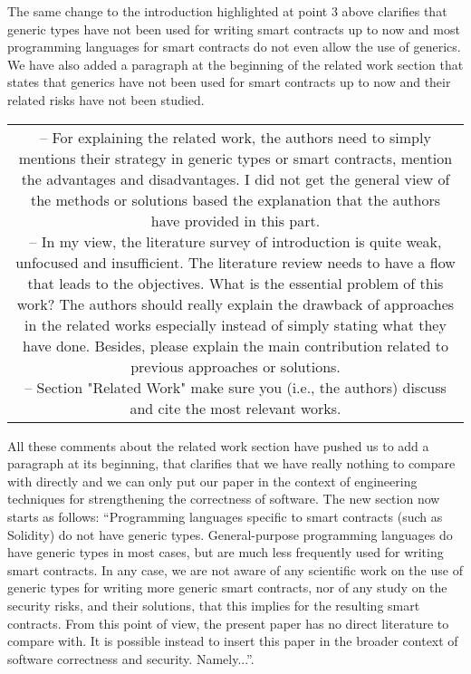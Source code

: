 \documentclass[journal,onecolumn, 11pt]{IEEEtran}
\newcommand{\BOX}[1]
{
  {\it
    \begin{center}
      \begin{tabular}{|c|}
        \hline
        \parbox{0.97\columnwidth}{
          \medskip
          #1
          \medskip} \\
        \hline
      \end{tabular}
    \end{center}
  }
}
\begin{document}
The same change to the introduction highlighted at point 3 above clarifies that generic types have not been used for writing smart contracts up to now and most programming
languages for smart contracts do not even allow the use of generics. We have also added a paragraph
at the beginning of the related work section that states that generics have not been used
for smart contracts up to now and their related risks have not been studied.

\BOX{6 -- For explaining the related work, the authors need to simply mentions their strategy in generic types or smart contracts, mention the advantages and disadvantages. I did not get the general view of the methods or solutions based the explanation that the authors have provided in this part. \\

\noindent 7 -- In my view, the literature survey of introduction is quite weak, unfocused and insufficient. The literature review needs to have a flow that leads to the objectives. What is the essential problem of this work? The authors should really explain the drawback of approaches in the related works especially instead of simply stating what they have done. Besides, please explain the main contribution related to previous approaches or solutions.\\

\noindent 8 -- Section "Related Work" make sure you (i.e., the authors) discuss and cite the most relevant works.}

All these comments about the related work section have pushed us to add a paragraph at its beginning, that clarifies that we have really nothing to compare with directly and we can only put our paper in the context of engineering techniques for strengthening the correctness of software. The new section now starts as follows: ``Programming languages specific to smart contracts (such as Solidity) do not have generic types. General-purpose programming languages do have generic types in most cases, but are much less frequently used for writing smart contracts. In any case, we are not aware of any scientific work on the use of generic types for writing more generic smart contracts, nor of any study on the security risks, and their solutions, that this implies for the resulting smart contracts. From this point of view, the present paper has no direct literature to compare with. It is possible instead to insert this paper in the broader context of software correctness and security. Namely...''.
\end{document}
